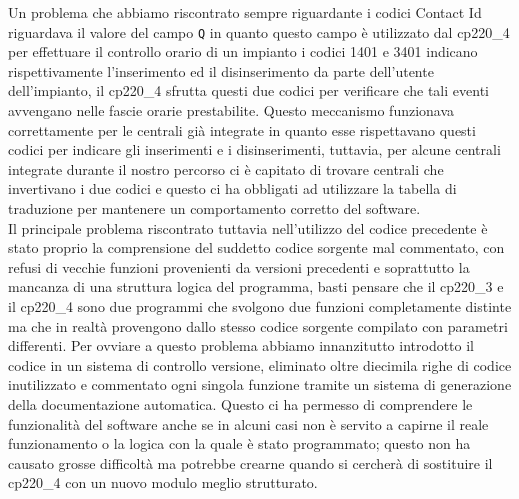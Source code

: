 Un problema che abbiamo riscontrato sempre riguardante i codici Contact Id riguardava il valore del campo \texttt{Q} in quanto questo campo è utilizzato dal cp220\_4 per effettuare il controllo orario di un impianto i codici 1401 e 3401 indicano rispettivamente l'inserimento ed il disinserimento da parte dell'utente dell'impianto, il cp220\_4 sfrutta questi due codici per verificare che tali eventi avvengano nelle fascie orarie prestabilite. Questo meccanismo funzionava correttamente per le centrali già integrate in quanto esse rispettavano questi codici per indicare gli inserimenti e i disinserimenti, tuttavia, per alcune centrali integrate durante il nostro percorso ci è capitato di trovare centrali che invertivano i due codici e questo ci ha obbligati ad utilizzare la tabella di traduzione per mantenere un comportamento corretto del software.\\
Il principale problema riscontrato tuttavia nell'utilizzo del codice precedente è stato proprio la comprensione del suddetto codice sorgente mal commentato, con refusi  di vecchie funzioni provenienti da versioni precedenti e soprattutto la mancanza di una struttura logica del programma, basti pensare che il cp220\_3 e il cp220\_4 sono due programmi che svolgono due funzioni completamente distinte ma che in realtà provengono dallo stesso codice sorgente compilato con parametri differenti. Per ovviare a questo problema abbiamo innanzitutto introdotto il codice in un sistema di controllo versione, eliminato oltre diecimila righe di codice inutilizzato e commentato ogni singola funzione tramite un sistema di generazione della documentazione automatica. Questo ci ha permesso di comprendere le funzionalità del software anche se in alcuni casi non è servito a capirne il reale funzionamento o la logica con la quale è stato programmato; questo non ha causato grosse difficoltà ma potrebbe crearne quando si cercherà di sostituire il cp220\_4 con un nuovo modulo meglio strutturato.


